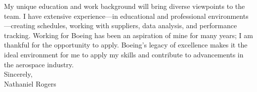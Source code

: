 \medskip
\hspace{1cm}My unique education and work background will bring diverse viewpoints to the team. I have extensive experience---in educational and professional environments---creating schedules, working with suppliers, data analysis, and performance tracking. Working for Boeing has been an aspiration of mine for many years; I am thankful for the opportunity to apply. Boeing's legacy of excellence makes it the ideal environment for me to apply my skills and contribute to advancements in the aerospace industry. \\
\bigskip
Sincerely, \\
\medskip
Nathaniel Rogers
